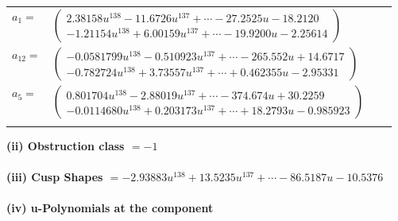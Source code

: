 \documentclass[1p]{elsarticle_modified}
\theoremstyle{definition}
\begin{document}
\begin{tabular}{m{7pt} m{180pt} m{7pt} m{180pt} }
\flushright $a_{1}=$&$\begin{pmatrix}2.38158 u^{138}-11.6726 u^{137}+\cdots-27.2525 u-18.2120\\-1.21154 u^{138}+6.00159 u^{137}+\cdots-19.9200 u-2.25614\end{pmatrix}$ \\
\flushright $a_{12}=$&$\begin{pmatrix}-0.0581799 u^{138}-0.510923 u^{137}+\cdots-265.552 u+14.6717\\-0.782724 u^{138}+3.73557 u^{137}+\cdots+0.462355 u-2.95331\end{pmatrix}$ \\
\flushright $a_{5}=$&$\begin{pmatrix}0.801704 u^{138}-2.88019 u^{137}+\cdots-374.674 u+30.2259\\-0.0114680 u^{138}+0.203173 u^{137}+\cdots+18.2793 u-0.985923\end{pmatrix}$\\&\end{tabular}
\flushleft \textbf{(ii) Obstruction class $= -1$}\\~\\
\flushleft \textbf{(iii) Cusp Shapes $= -2.93883 u^{138}+13.5235 u^{137}+\cdots-86.5187 u-10.5376$}\\~\\
\newpage\renewcommand{\arraystretch}{1}
\flushleft \textbf{(iv) u-Polynomials at the component}\newline \\
\end{document}
